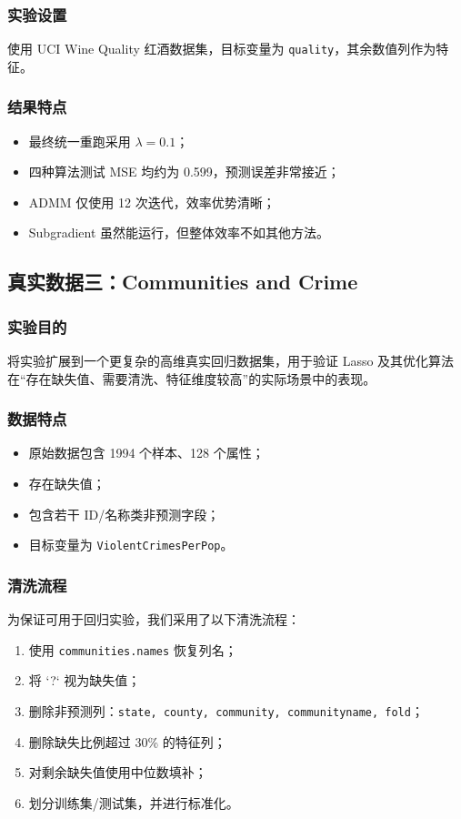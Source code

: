\documentclass[12pt,a4paper]{ctexart}
\begin{document}
\subsubsection{实验设置}
使用 UCI Wine Quality 红酒数据集，目标变量为 \texttt{quality}，其余数值列作为特征。

\subsubsection{结果特点}
\begin{itemize}[leftmargin=2em]
    \item 最终统一重跑采用 $\lambda=0.1$；
    \item 四种算法测试 MSE 均约为 0.599，预测误差非常接近；
    \item ADMM 仅使用 12 次迭代，效率优势清晰；
    \item Subgradient 虽然能运行，但整体效率不如其他方法。
\end{itemize}

\subsection{真实数据三：Communities and Crime}
\subsubsection{实验目的}
将实验扩展到一个更复杂的高维真实回归数据集，用于验证 Lasso 及其优化算法在“存在缺失值、需要清洗、特征维度较高”的实际场景中的表现。

\subsubsection{数据特点}
\begin{itemize}[leftmargin=2em]
    \item 原始数据包含 1994 个样本、128 个属性；
    \item 存在缺失值；
    \item 包含若干 ID/名称类非预测字段；
    \item 目标变量为 \texttt{ViolentCrimesPerPop}。
\end{itemize}

\subsubsection{清洗流程}
为保证可用于回归实验，我们采用了以下清洗流程：
\begin{enumerate}[label=\arabic*.]
    \item 使用 \texttt{communities.names} 恢复列名；
    \item 将 `?` 视为缺失值；
    \item 删除非预测列：\texttt{state, county, community, communityname, fold}；
    \item 删除缺失比例超过 30\% 的特征列；
    \item 对剩余缺失值使用中位数填补；
    \item 划分训练集/测试集，并进行标准化。
\end{enumerate}
\end{document}

